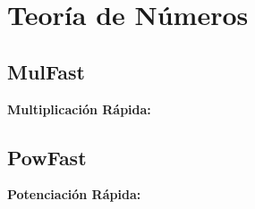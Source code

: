 \documentclass[10pt,letterpaper,twocolumn]{article}
\newcommand{\codigofuente}[1]{

\dotfill
}
\begin{document}
\section{Teoría de Números}
\subsection{MulFast}
\small
\textbf{Multiplicación Rápida:}
\codigofuente{./src/teoria_de_numeros/mul_fast.java}

\subsection{PowFast}
\small
\textbf{Potenciación Rápida:}
\codigofuente{./src/teoria_de_numeros/pow_fast.java}
\end{document}
